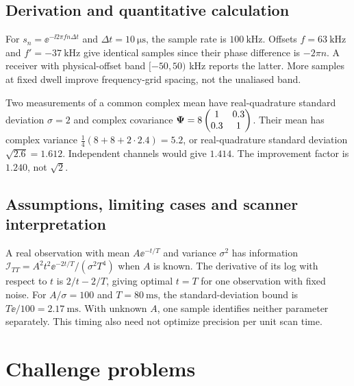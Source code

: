 \subsection{Derivation and quantitative calculation}
\begin{workedexample}
For $s_n=\ee^{-\ii2\pi f n\Delta t}$ and
$\Delta t=\SI{10}{\micro\second}$, the sample rate is
$\SI{100}{\kilo\hertz}$.
Offsets $f=\SI{63}{\kilo\hertz}$ and $f'=-\SI{37}{\kilo\hertz}$
give identical samples since their phase difference is $-2\pi n$.
A receiver with physical-offset band $[-50,50)$ kHz reports the latter.
More samples at fixed dwell improve frequency-grid spacing, not the
unaliased band.
\end{workedexample}
\begin{workedexample}
Two measurements of a common complex mean have real-quadrature standard
deviation $\sigma=2$ and complex covariance
$\mathbf{\Psi}=8\begin{pmatrix}1&0.3\\0.3&1\end{pmatrix}$.
Their mean has complex variance
$\tfrac14(8+8+2\cdot2.4)=5.2$, or real-quadrature standard deviation
$\sqrt{2.6}=1.612$. Independent channels would give $1.414$.
The improvement factor is $1.240$, not $\sqrt2$.
\end{workedexample}
\subsection{Assumptions, limiting cases and scanner interpretation}
\begin{workedexample}
A real observation with mean $A\ee^{-t/T}$ and variance $\sigma^2$
has information
$\mathcal I_{TT}=A^2t^2\ee^{-2t/T}/(\sigma^2T^4)$ when $A$ is known.
The derivative of its log with respect to $t$ is $2/t-2/T$, giving
optimal $t=T$ for one observation with fixed noise.
For $A/\sigma=100$ and $T=\SI{80}{\milli\second}$, the standard-deviation
bound is $T\ee/100=\SI{2.17}{\milli\second}$.
With unknown $A$, one sample identifies neither parameter separately.
This timing also need not optimize precision per unit scan time.
\end{workedexample}

\section{Challenge problems}
\label{sec:01:challenge-problems}
